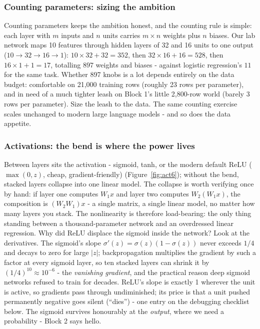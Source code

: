 \documentclass[11pt,a4paper]{article}
\begin{document}
\subsubsection{Counting parameters: sizing the ambition}
Counting parameters keeps the ambition honest, and the counting rule is
simple: each layer with $m$ inputs and $n$ units carries $m \times n$
weights plus $n$ biases. Our lab network maps 10 features through hidden
layers of 32 and 16 units to one output ($10 \to 32 \to 16 \to 1$):
$10 \times 32 + 32 = 352$, then $32 \times 16 + 16 = 528$, then
$16 \times 1 + 1 = 17$, totalling $897$ weights and biases - against
logistic regression's $11$ for the same task. Whether 897 knobs is a lot
depends entirely on the data budget: comfortable on 21{,}000 training
rows (roughly 23 rows per parameter), and in need of a much tighter
leash on Block 1's little 2{,}800-row world (barely 3 rows per
parameter). Size the leash to the data. The same counting exercise
scales unchanged to modern large language models - and so does the
data appetite.

\subsubsection{Activations: the bend is where the power lives}
Between layers sits the activation - sigmoid, tanh, or the modern
default ReLU ($\max(0,z)$, cheap, gradient-friendly)
(Figure~\ref{fig:act6}); without the bend, stacked layers collapse into
one linear model. The collapse is worth verifying once by hand: if
layer one computes $W_1 x$ and layer two computes $W_2 (W_1 x)$, the
composition is $(W_2 W_1) x$ - a single matrix, a single linear model,
no matter how many layers you stack. The nonlinearity is therefore
load-bearing: the only thing standing between a thousand-parameter
network and an overdressed linear regression. Why did ReLU displace the
sigmoid inside the network? Look at the derivatives. The sigmoid's
slope $\sigma'(z) = \sigma(z)(1-\sigma(z))$ never exceeds $1/4$ and
decays to zero for large $|z|$; backpropagation multiplies the gradient
by such a factor at every sigmoid layer, so ten stacked layers can
shrink it by $(1/4)^{10} \approx 10^{-6}$ - the \emph{vanishing
gradient}, and the practical reason deep sigmoid networks refused to
train for decades. ReLU's slope is exactly 1 wherever the unit is
active, so gradients pass through undiminished; its price is that a
unit pushed permanently negative goes silent (``dies'') - one entry on
the debugging checklist below. The sigmoid survives honourably at the
\emph{output}, where we need a probability - Block 2 says hello.
\end{document}
